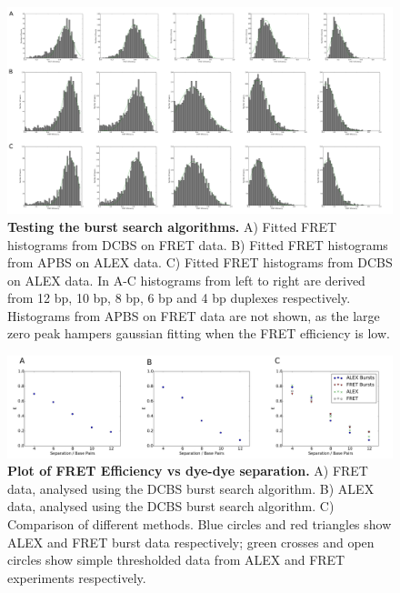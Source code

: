 \documentclass[10pt]{article}
\begin{document}
\begin{figure}[!ht]
   \begin{center}
      \includegraphics*[clip=true, width=6in]{burst_search.pdf}
      \caption{{\bf Testing the burst search algorithms.} A) Fitted FRET histograms from DCBS on FRET data. B) Fitted FRET histograms from APBS on ALEX data. C) Fitted FRET histograms from DCBS on ALEX data. In A-C histograms from left to right are derived from 12 bp, 10 bp, 8 bp, 6 bp and 4 bp duplexes respectively. Histograms from APBS on FRET data are not shown, as the large zero peak hampers gaussian fitting when the FRET efficiency is low.}
      \label{fig:burst_search}
   \end{center}
\end{figure}

\begin{figure}[!ht]
   \begin{center}
      \includegraphics*[clip=true, width=6in]{Bp_vs_E.pdf}
      \caption{{\bf Plot of FRET Efficiency vs dye-dye separation.} A) FRET data, analysed using the DCBS burst search algorithm. B) ALEX data, analysed using the DCBS burst search algorithm. C) Comparison of different methods. Blue circles and red triangles show ALEX and FRET burst data respectively; green crosses and open circles show simple thresholded data from ALEX and FRET experiments respectively.}
      \label{fig:fig6_Eplots}
   \end{center}
\end{figure}
\end{document}
